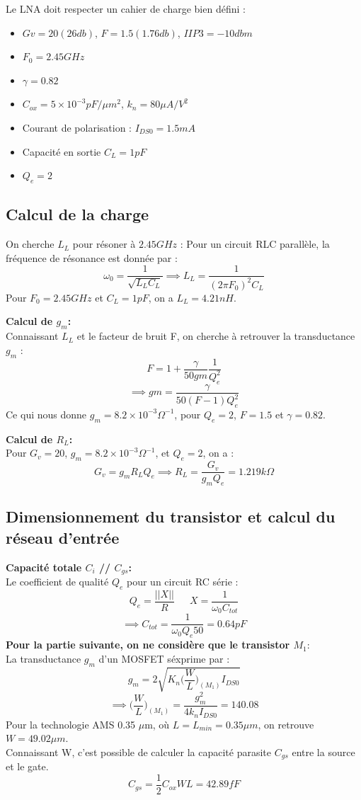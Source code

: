 \documentclass[a4paper]{article}
\begin{document}
Le LNA doit respecter un cahier de charge bien d\'efini :
\begin{itemize} \itemsep -3pt
  \item $Gv = 20 (26 db)$, $F = 1.5 (1.76 db)$, $IIP3 = -10 dbm$
  \item $F_0 = 2.45 GHz$
  \item$\gamma = 0.82$
  \item $C_{ox} = 5 \times 10^{-3} pF/\mu m^2 $, $k_n = 80 \mu A/V^2$
  \item Courant de polarisation : $I_{DS0} = 1.5 mA$
  \item Capacit\'e en sortie $C_L = 1 pF $
  \item $Q_e = 2$
\end{itemize}


\subsection{Calcul de la charge}
On cherche $L_L$ pour r\'esoner \`a $2.45 GHz$ : Pour un circuit RLC parall\`ele,
la fr\'equence de r\'esonance est donn\'ee par :
\[
  \omega_0 = \frac{1}{\sqrt{L_L C_L}} \implies L_L = \frac{1}{(2\pi F_0)^2 C_L}
\]
Pour $F_0 = 2.45 GHz$ et $C_L = 1 pF$, on a $L_L = 4.21 nH$.

\textbf{Calcul de $g_m$:}\\
Connaissant $L_L$ et le facteur de bruit F, on cherche \`a retrouver la transductance $g_m$ :
\[
  F = 1 + \frac{\gamma}{50 gm} \frac{1}{Q^2_e}
\]
\[
  \implies gm = \frac{\gamma}{50 (F-1) Q^2_e}
\]
Ce qui nous donne $g_m = 8.2 \times 10^{-3} \Omega^{-1}$, pour $Q_e = 2$, $F = 1.5$ et $\gamma = 0.82$.

\textbf{Calcul de $R_L$:}\\
Pour $G_v = 20$, $g_m = 8.2 \times 10^{-3} \Omega^{-1}$, et $Q_e = 2$, on a :
  \[
    G_v = g_m R_L Q_e \implies R_L = \frac{G_v}{g_m Q_e} = 1.219 k\Omega
  \]

\subsection{Dimensionnement du transistor et calcul du r\'eseau d'entr\'ee}
\textbf{Capacit\'e totale $C_i$ // $C_{gs}$:}\\
Le coefficient de qualit\'e $Q_e$ pour un circuit RC s\'erie :
\[
  Q_e = \frac{||X||}{R} \phantom{4}\phantom{4}\phantom{4} X = \frac{1}{\omega_0 C_{tot}}
\]
\[
\implies C_{tot} = \frac{1}{\omega_0 Q_e 50} = 0.64 pF
\]
\textbf{Pour la partie suivante, on ne consid\`ere que le transistor $M_1$}:\\
La transductance $g_m$ d'un MOSFET s\'exprime par :
\[
  g_m = 2\sqrt{K_n \bigg( \frac{W}{L} \bigg)_{(M_1)} I_{DS0}}
\]
\[
\implies \bigg(\frac{W}{L}\bigg)_{(M_1)}  = \frac{g^2_m}{4 k_n I_{DS0}} = 140.08
\]
Pour la technologie AMS 0.35 $\mu$m, o\`u $L = L_{min} = 0.35 \mu m$, on retrouve $W = 49.02 \mu m$.\\
Connaissant W, c'est possible de calculer la capacit\'e parasite $C_{gs}$ entre la source et le gate.
\[
C_{gs} = \frac{1}{2} C_{ox} W L = 42.89 fF
\]
\end{document}
